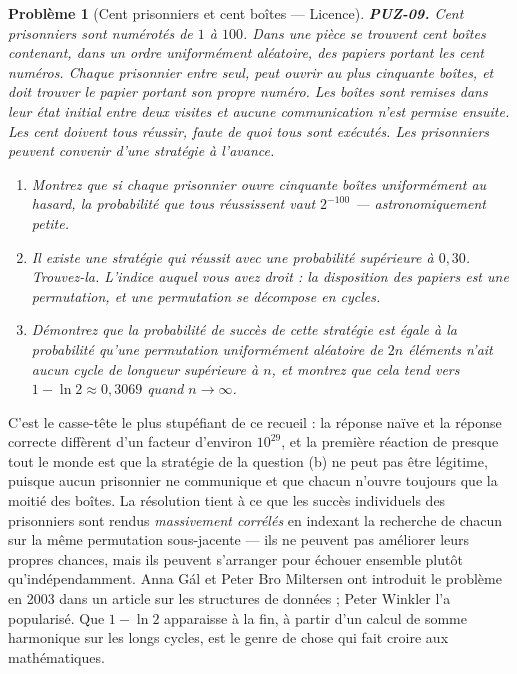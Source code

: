 \documentclass[11pt]{article}
\newtheorem{problem}{Problème}
\begin{document}
\begin{problem}[{Cent prisonniers et cent boîtes --- Licence}]
\textbf{PUZ-09.} Cent prisonniers sont numérotés de $ 1 $ à $ 100 $. Dans une pièce
se trouvent cent boîtes contenant, dans un ordre uniformément aléatoire, des papiers
portant les cent numéros. Chaque prisonnier entre seul, peut ouvrir au plus cinquante
boîtes, et doit trouver le papier portant son propre numéro. Les boîtes sont remises dans
leur état initial entre deux visites et aucune communication n'est permise ensuite. Les
cent doivent tous réussir, faute de quoi tous sont exécutés. Les prisonniers peuvent
convenir d'une stratégie à l'avance.
\begin{enumerate}
\item[(a)] Montrez que si chaque prisonnier ouvre cinquante boîtes uniformément au hasard, la
probabilité que tous réussissent vaut $ 2^{-100} $ --- astronomiquement petite.
\item[(b)] Il existe une stratégie qui réussit avec une probabilité supérieure à $ 0{,}30 $.
Trouvez-la. L'indice auquel vous avez droit : la disposition des papiers est une
permutation, et une permutation se décompose en cycles.
\item[(c)] Démontrez que la probabilité de succès de cette stratégie est égale à la probabilité
qu'une permutation uniformément aléatoire de $ 2n $ éléments n'ait aucun cycle de
longueur supérieure à $ n $, et montrez que cela tend vers
$ 1 - \ln 2 \approx 0{,}3069 $ quand $ n \to \infty $.
\end{enumerate}

\end{problem}

\noindent C'est le casse-tête le plus stupéfiant de ce recueil : la réponse naïve
et la réponse correcte diffèrent d'un facteur d'environ $ 10^{29} $, et la première
réaction de presque tout le monde est que la stratégie de la question (b) ne peut pas être
légitime, puisque aucun prisonnier ne communique et que chacun n'ouvre toujours que la
moitié des boîtes. La résolution tient à ce que les succès individuels des prisonniers sont
rendus \textit{massivement corrélés} en indexant la recherche de chacun sur la même
permutation sous-jacente --- ils ne peuvent pas améliorer leurs propres chances, mais ils
peuvent s'arranger pour échouer ensemble plutôt qu'indépendamment. Anna Gál et Peter Bro
Miltersen ont introduit le problème en 2003 dans un article sur les structures de données ;
Peter Winkler l'a popularisé. Que $ 1 - \ln 2 $ apparaisse à la fin, à partir d'un calcul
de somme harmonique sur les longs cycles, est le genre de chose qui fait croire aux
mathématiques.
\end{document}
